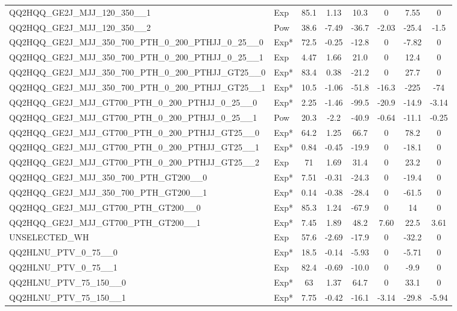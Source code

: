 \begin{table}[!h]
\begin{adjustbox}{width={\textwidth},totalheight={\textheight},keepaspectratio}
\begin{tabular}{llcccccc}
 QQ2HQQ\_GE2J\_MJJ\_120\_350\_\_1 & Exp & 85.1 & 1.13 & 10.3 & 0 & 7.55 & 0 \\
 QQ2HQQ\_GE2J\_MJJ\_120\_350\_\_2 & Pow & 38.6 & -7.49 & -36.7 & -2.03 & -25.4 & -1.5 \\
 QQ2HQQ\_GE2J\_MJJ\_350\_700\_PTH\_0\_200\_PTHJJ\_0\_25\_\_0 & Exp* & 72.5 & -0.25 & -12.8 & 0 & -7.82 & 0 \\
 QQ2HQQ\_GE2J\_MJJ\_350\_700\_PTH\_0\_200\_PTHJJ\_0\_25\_\_1 & Exp & 4.47 & 1.66 & 21.0 & 0 & 12.4 & 0 \\
 QQ2HQQ\_GE2J\_MJJ\_350\_700\_PTH\_0\_200\_PTHJJ\_GT25\_\_0 & Exp* & 83.4 & 0.38 & -21.2 & 0 & 27.7 & 0 \\
 QQ2HQQ\_GE2J\_MJJ\_350\_700\_PTH\_0\_200\_PTHJJ\_GT25\_\_1 & Exp* & 10.5 & -1.06 & -51.8 & -16.3 & -225 & -74 \\
 QQ2HQQ\_GE2J\_MJJ\_GT700\_PTH\_0\_200\_PTHJJ\_0\_25\_\_0 & Exp* & 2.25 & -1.46 & -99.5 & -20.9 & -14.9 & -3.14 \\
 QQ2HQQ\_GE2J\_MJJ\_GT700\_PTH\_0\_200\_PTHJJ\_0\_25\_\_1 & Pow & 20.3 & -2.2 & -40.9 & -0.64 & -11.1 & -0.25 \\
 QQ2HQQ\_GE2J\_MJJ\_GT700\_PTH\_0\_200\_PTHJJ\_GT25\_\_0 & Exp* & 64.2 & 1.25 & 66.7 & 0 & 78.2 & 0 \\
 QQ2HQQ\_GE2J\_MJJ\_GT700\_PTH\_0\_200\_PTHJJ\_GT25\_\_1 & Exp* & 0.84 & -0.45 & -19.9 & 0 & -18.1 & 0 \\
 QQ2HQQ\_GE2J\_MJJ\_GT700\_PTH\_0\_200\_PTHJJ\_GT25\_\_2 & Exp & 71 & 1.69 & 31.4 & 0 & 23.2 & 0 \\
 QQ2HQQ\_GE2J\_MJJ\_350\_700\_PTH\_GT200\_\_0 & Exp* & 7.51 & -0.31 & -24.3 & 0 & -19.4 & 0 \\
 QQ2HQQ\_GE2J\_MJJ\_350\_700\_PTH\_GT200\_\_1 & Exp* & 0.14 & -0.38 & -28.4 & 0 & -61.5 & 0 \\
 QQ2HQQ\_GE2J\_MJJ\_GT700\_PTH\_GT200\_\_0 & Exp* & 85.3 & 1.24 & -67.9 & 0 & 14 & 0 \\
 QQ2HQQ\_GE2J\_MJJ\_GT700\_PTH\_GT200\_\_1 & Exp* & 7.45 & 1.89 & 48.2 & 7.60 & 22.5 & 3.61 \\
 UNSELECTED\_WH & Exp & 57.6 & -2.69 & -17.9 & 0 & -32.2 & 0 \\
 QQ2HLNU\_PTV\_0\_75\_\_0 & Exp* & 18.5 & -0.14 & -5.93 & 0 & -5.71 & 0 \\
 QQ2HLNU\_PTV\_0\_75\_\_1 & Exp & 82.4 & -0.69 & -10.0 & 0 & -9.9 & 0 \\
 QQ2HLNU\_PTV\_75\_150\_\_0 & Exp* & 63 & 1.37 & 64.7 & 0 & 33.1 & 0  \\
 QQ2HLNU\_PTV\_75\_150\_\_1 & Exp* & 7.75 & -0.42 & -16.1 & -3.14 & -29.8 & -5.94 \\

\end{tabular}
\end{adjustbox}
\end{table}
